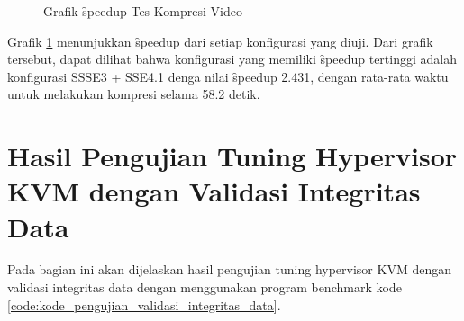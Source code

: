 
\begin{figure}
    \centering
    \caption{Grafik \f{speedup} Tes Kompresi Video}
    \label{fig:video_compression_test_graph}
\end{figure}

Grafik \ref{fig:video_compression_test_graph} menunjukkan \f{speedup} dari setiap konfigurasi yang diuji. Dari grafik tersebut, dapat dilihat bahwa konfigurasi yang memiliki \f{speedup} tertinggi adalah konfigurasi SSSE3 + SSE4.1 denga nilai \f{speedup} 2.431, dengan rata-rata waktu untuk melakukan kompresi selama 58.2 detik.

\section{Hasil Pengujian Tuning Hypervisor KVM dengan Validasi Integritas Data}
Pada bagian ini akan dijelaskan hasil pengujian tuning hypervisor KVM dengan validasi integritas data dengan menggunakan program benchmark kode \ref{code:kode_pengujian_validasi_integritas_data}.

